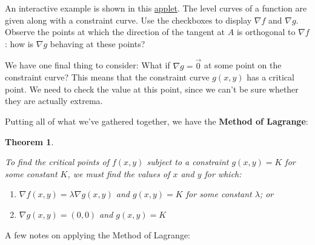 \documentclass[
]{book}
\providecommand{\tightlist}{%
  \setlength{\itemsep}{0pt}\setlength{\parskip}{0pt}}
\newtheorem{theorem}{Theorem}[chapter]
\theoremstyle{definition}
\theoremstyle{definition}
\theoremstyle{definition}
\theoremstyle{definition}
\theoremstyle{remark}
\begin{document}
An interactive example is shown in this \href{https://www.geogebra.org/m/wkkdvhqv}{applet}. The level curves of a function are given along with a constraint curve. Use the checkboxes to display \(\nabla f\) and \(\nabla g\). Observe the points at which the direction of the tangent at \(A\) is orthogonal to \(\nabla f\): how is \(\nabla g\) behaving at these points?

We have one final thing to consider: What if \(\nabla g=\vec{0}\) at some point on the constraint curve? This means that the constraint curve \(g(x,y)\) has a critical point. We need to check the value at this point, since we can't be sure whether they are actually extrema.

Putting all of what we've gathered together, we have the \textbf{Method of Lagrange}:

\begin{theorem}
\protect\hypertarget{thm:unlabeled-div-67}{}\label{thm:unlabeled-div-67}

To find the critical points of \(f(x,y)\) subject to a constraint \(g(x,y)=K\) for some constant \(K\), we must find the values of \(x\) and \(y\) for which:

\begin{enumerate}
\def\labelenumi{\arabic{enumi}.}
\tightlist
\item
  \(\nabla f(x,y)=\lambda \nabla g(x,y)\) and \(g(x,y)=K\) for some constant \(\lambda\); or
\item
  \(\nabla g(x,y)=(0,0)\) and \(g(x,y)=K\)
\end{enumerate}

\end{theorem}

A few notes on applying the Method of Lagrange:
\end{document}
